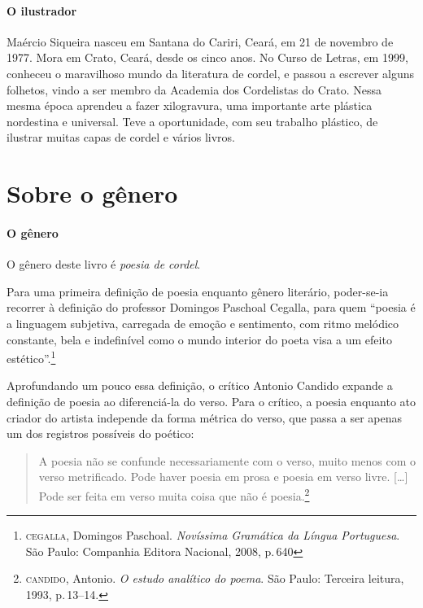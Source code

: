 \documentclass[11pt]{extarticle}
\begin{document}
\paragraph{O ilustrador}
Maércio Siqueira nasceu em Santana do Cariri, Ceará, em 21 de novembro de 1977.
Mora em Crato, Ceará, desde os cinco anos. No Curso de Letras, em 1999, conheceu o
maravilhoso mundo da literatura de cordel, e passou a escrever alguns
folhetos, vindo a ser membro da Academia dos Cordelistas do Crato.
Nessa mesma época aprendeu a fazer xilogravura, uma importante arte
plástica nordestina e universal. Teve a oportunidade, com seu trabalho plástico, de ilustrar muitas capas de cordel e vários livros.


\section{Sobre o gênero}

\paragraph{O gênero} O gênero deste livro é \textit{poesia de cordel}. 


Para uma primeira definição de poesia enquanto gênero literário, poder-se-ia recorrer à definição do professor Domingos Paschoal Cegalla, para quem ``poesia é a linguagem subjetiva, carregada de emoção e sentimento, com ritmo melódico constante, bela e indefinível como o mundo interior do poeta visa a um efeito estético''.\footnote{\textsc{cegalla}, Domingos Paschoal. \textit{Novíssima Gramática da Língua Portuguesa}. São Paulo: Companhia Editora Nacional, 2008, p.\,640}

Aprofundando um pouco essa definição, o crítico Antonio Candido expande a definição de poesia ao diferenciá-la do verso.
Para o crítico, a poesia enquanto ato criador do artista independe da forma métrica do verso, que passa a ser apenas um dos registros possíveis do poético:

\begin{quote}
A poesia não se confunde necessariamente com o verso, muito menos com o verso metrificado. Pode haver poesia em prosa e poesia em verso livre. [\ldots]
Pode ser feita em verso muita coisa que não é poesia.\footnote{\textsc{candido}, Antonio. \textit{O estudo analítico do poema}. São Paulo: Terceira leitura, 1993, p.\,13--14.}
\end{quote}
\end{document}
